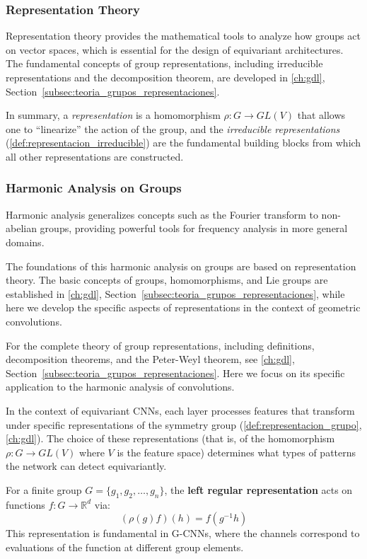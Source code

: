 \subsubsection{Representation Theory}

Representation theory provides the mathematical tools to analyze how groups act on vector spaces, which is essential for the design of equivariant architectures. The fundamental concepts of group representations, including irreducible representations and the decomposition theorem, are developed in \autoref{ch:gdl}, Section~\ref{subsec:teoria_grupos_representaciones}.

In summary, a \textit{representation} is a homomorphism $\rho: G \to GL(V)$ that allows one to ``linearize'' the action of the group, and the \textit{irreducible representations} (\autoref{def:representacion_irreducible}) are the fundamental building blocks from which all other representations are constructed.

\subsubsection{Harmonic Analysis on Groups}

Harmonic analysis generalizes concepts such as the Fourier transform to non-abelian groups, providing powerful tools for frequency analysis in more general domains.

The foundations of this harmonic analysis on groups are based on representation theory. The basic concepts of groups, homomorphisms, and Lie groups are established in \autoref{ch:gdl}, Section~\ref{subsec:teoria_grupos_representaciones}, while here we develop the specific aspects of representations in the context of geometric convolutions.

For the complete theory of group representations, including definitions, decomposition theorems, and the Peter-Weyl theorem, see \autoref{ch:gdl}, Section~\ref{subsec:teoria_grupos_representaciones}. Here we focus on its specific application to the harmonic analysis of convolutions.

In the context of equivariant \glspl{CNN}, each layer processes features that transform under specific representations of the symmetry group (\autoref{def:representacion_grupo}, \autoref{ch:gdl}). The choice of these representations (that is, of the homomorphism $\rho: G \to GL(V)$ where $V$ is the feature space) determines what types of patterns the network can detect equivariantly.

\begin{example}\label{ex:representacion_regular_cnn}
For a finite group $G = \{g_1, g_2, \ldots, g_n\}$, the \textbf{left regular representation} acts on functions $f: G \rightarrow \mathbb{R}^d$ via:
\begin{equation}
(\rho(g)f)(h) = f(g^{-1}h)
\end{equation}
This representation is fundamental in G-\glspl{CNN}, where the channels correspond to evaluations of the function at different group elements.
\end{example}

